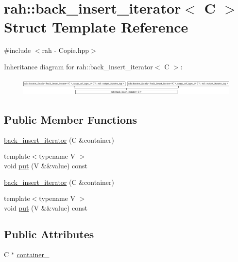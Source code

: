 \hypertarget{structrah_1_1back__insert__iterator}{}\section{rah\+::back\+\_\+insert\+\_\+iterator$<$ C $>$ Struct Template Reference}
\label{structrah_1_1back__insert__iterator}


{\ttfamily \#include $<$rah -\/ Copie.\+hpp$>$}

Inheritance diagram for rah\+::back\+\_\+insert\+\_\+iterator$<$ C $>$\+:\begin{figure}[H]
\begin{center}
\leavevmode
\includegraphics[height=0.965517cm]{structrah_1_1back__insert__iterator}
\end{center}
\end{figure}
\subsection*{Public Member Functions}
\begin{DoxyCompactItemize}
\item 
\mbox{\hyperlink{structrah_1_1back__insert__iterator_a7c208b6bee5af4ca1f87a0a52df8069c}{back\+\_\+insert\+\_\+iterator}} (C \&container)
\item 
{\footnotesize template$<$typename V $>$ }\\void \mbox{\hyperlink{structrah_1_1back__insert__iterator_a5af149b87aebf5ced8a4143afe79ad50}{put}} (V \&\&value) const
\item 
\mbox{\hyperlink{structrah_1_1back__insert__iterator_a7c208b6bee5af4ca1f87a0a52df8069c}{back\+\_\+insert\+\_\+iterator}} (C \&container)
\item 
{\footnotesize template$<$typename V $>$ }\\void \mbox{\hyperlink{structrah_1_1back__insert__iterator_a5af149b87aebf5ced8a4143afe79ad50}{put}} (V \&\&value) const
\end{DoxyCompactItemize}
\subsection*{Public Attributes}
\begin{DoxyCompactItemize}
\item 
C $\ast$ \mbox{\hyperlink{structrah_1_1back__insert__iterator_ad60a5db0dd4ae59777b739c5a581f635}{container\+\_\+}}
\end{DoxyCompactItemize}


